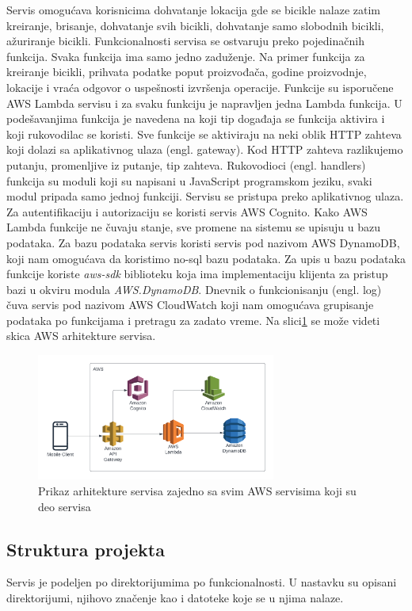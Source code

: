\documentclass[12pt,oneside]{memoir}
\begin{document}
Servis omogućava korisnicima dohvatanje lokacija gde se bicikle nalaze zatim kreiranje, brisanje, dohvatanje svih bicikli, dohvatanje samo slobodnih bicikli, ažuriranje bicikli. Funkcionalnosti servisa se ostvaruju preko pojedinačnih funkcija. Svaka funkcija ima samo jedno zaduženje. Na primer funkcija za kreiranje bicikli, prihvata podatke poput proizvođača, godine proizvodnje, lokacije i vraća odgovor o uspešnosti izvršenja operacije. Funkcije su isporučene AWS Lambda servisu i za svaku funkciju je napravljen jedna Lambda funkcija. U podešavanjima funkcija je navedena na koji tip događaja se funkcija aktivira i koji rukovodilac se koristi. Sve funkcije se aktiviraju na neki oblik HTTP zahteva koji dolazi sa aplikativnog ulaza (engl. gateway). Kod HTTP zahteva razlikujemo putanju, promenljive iz putanje, tip zahteva. Rukovodioci (engl. handlers) funkcija su moduli koji su napisani u JavaScript programskom jeziku, svaki modul pripada samo jednoj funkciji. Servisu se pristupa preko aplikativnog ulaza. Za autentifikaciju i autorizaciju se koristi servis AWS Cognito. Kako AWS Lambda funkcije ne čuvaju stanje, sve promene na sistemu se upisuju u bazu podataka. Za bazu podataka servis koristi servis pod nazivom AWS DynamoDB, koji nam omogućava da koristimo no-sql bazu podataka. Za upis u bazu podataka funkcije koriste \emph{aws-sdk}  biblioteku koja ima implementaciju klijenta za pristup bazi u okviru modula \emph{AWS.DynamoDB}. Dnevnik o funkcionisanju (engl. log) čuva servis pod nazivom AWS CloudWatch koji nam omogućava grupisanje podataka po funkcijama i pretragu za zadato vreme. Na slici\ref{fig:awsArchitecture} se može videti skica AWS arhitekture servisa.

\begin{figure}[!ht]
  \centering
  \includegraphics[width=0.7\textwidth]{AWS-Architecture-Overview.PNG}
  \caption{Prikaz arhitekture servisa zajedno sa svim AWS servisima koji su deo servisa}
  \label{fig:awsArchitecture}
\end{figure}


\subsection{Struktura projekta}
Servis je podeljen po direktorijumima po funkcionalnosti. U nastavku su opisani direktorijumi, njihovo značenje kao i datoteke koje se u njima nalaze.
\end{document}
